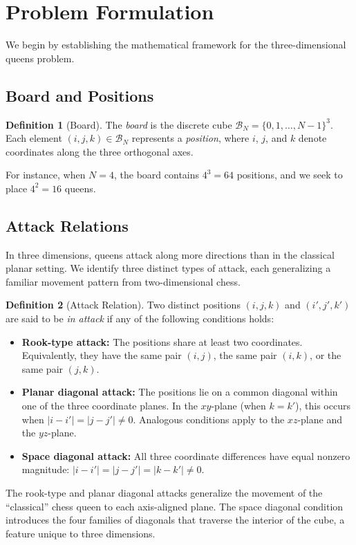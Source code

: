 \documentclass[10pt,twocolumn,a4paper]{article}
\newcommand{\board}{\mathcal{B}}
\theoremstyle{definition}
\newtheorem{definition}{Definition}[section]
\theoremstyle{remark}
\begin{document}
\section{Problem Formulation}\label{sec:formulation}
We begin by establishing the mathematical framework for the three-dimensional queens problem.

\subsection{Board and Positions}
\begin{definition}[Board]
The \emph{board} is the discrete cube $\board_N=\{0,1,\ldots,N-1\}^3$. Each element $(i,j,k)\in\board_N$ represents a \emph{position}, where $i$, $j$, and $k$ denote coordinates along the three orthogonal axes.
\end{definition}
For instance, when $N=4$, the board contains $4^3=64$ positions, and we seek to place $4^2=16$ queens.

\subsection{Attack Relations}
In three dimensions, queens attack along more directions than in the classical planar setting. We identify three distinct types of attack, each generalizing a familiar movement pattern from two-dimensional chess.

\begin{definition}[Attack Relation]\label{def:attack}
Two distinct positions $(i,j,k)$ and $(i',j',k')$ are said to be \emph{in attack} if any of the following conditions holds:
\begin{itemize}[leftmargin=*]
\item \textbf{Rook-type attack:} The positions share at least two coordinates. Equivalently, they have the same pair $(i,j)$, the same pair $(i,k)$, or the same pair $(j,k)$.
\item \textbf{Planar diagonal attack:} The positions lie on a common diagonal within one of the three coordinate planes. In the $xy$-plane (when $k=k'$), this occurs when $|i-i'|=|j-j'|\ne0$. Analogous conditions apply to the $xz$-plane and the $yz$-plane.
\item \textbf{Space diagonal attack:} All three coordinate differences have equal nonzero magnitude: $|i-i'|=|j-j'|=|k-k'|\ne0$.
\end{itemize}
\end{definition}
The rook-type and planar diagonal attacks generalize the movement of the ``classical'' chess queen to each axis-aligned plane. The space diagonal condition introduces the four families of diagonals that traverse the interior of the cube, a feature unique to three dimensions.
\end{document}
